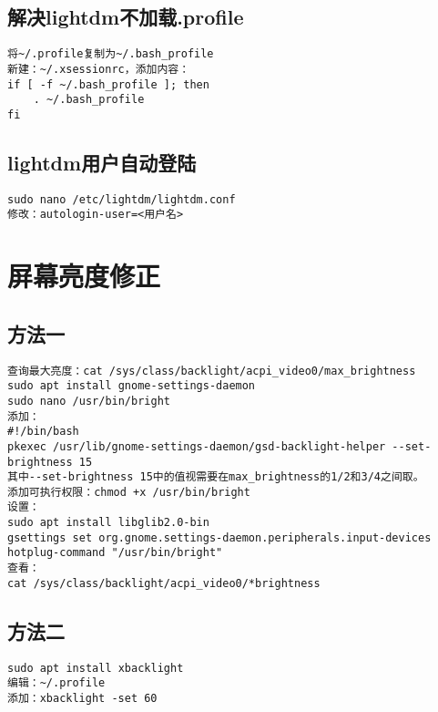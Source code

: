 \documentclass[a4paper,fontset=fandol,zihao=-4,linespread=1.2]{ctexbook}
\begin{document}
\subsection{解决lightdm不加载.profile}
\begin{lstlisting}
将~/.profile复制为~/.bash_profile
新建：~/.xsessionrc，添加内容：
if [ -f ~/.bash_profile ]; then
    . ~/.bash_profile
fi
\end{lstlisting}

\subsection{lightdm用户自动登陆}
\begin{lstlisting}
sudo nano /etc/lightdm/lightdm.conf
修改：autologin-user=<用户名>
\end{lstlisting}

\section{屏幕亮度修正}
\subsection{方法一}
\begin{lstlisting}
查询最大亮度：cat /sys/class/backlight/acpi_video0/max_brightness
sudo apt install gnome-settings-daemon
sudo nano /usr/bin/bright
添加：
#!/bin/bash
pkexec /usr/lib/gnome-settings-daemon/gsd-backlight-helper --set-brightness 15
其中--set-brightness 15中的值视需要在max_brightness的1/2和3/4之间取。
添加可执行权限：chmod +x /usr/bin/bright
设置：
sudo apt install libglib2.0-bin
gsettings set org.gnome.settings-daemon.peripherals.input-devices hotplug-command "/usr/bin/bright"
查看：
cat /sys/class/backlight/acpi_video0/*brightness
\end{lstlisting}

\subsection{方法二}
\begin{lstlisting}
sudo apt install xbacklight
编辑：~/.profile
添加：xbacklight -set 60
\end{lstlisting}
\end{document}
